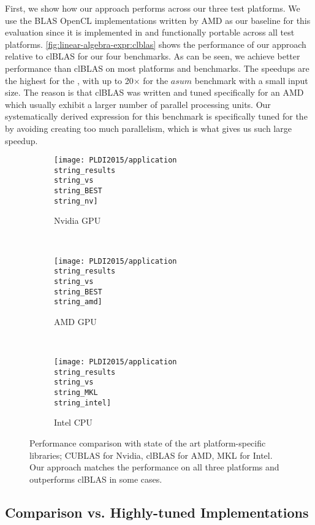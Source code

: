 First, we show how our approach performs across our three test platforms.
We use the BLAS OpenCL implementations written by AMD as our baseline for this evaluation since it is implemented in \OpenCL and functionally portable across all test platforms.
\autoref{fig:linear-algebra-expr:clblas} shows the performance of our approach relative to clBLAS for our four benchmarks.
As can be seen, we achieve better performance than clBLAS on most platforms and benchmarks.
The speedups are the highest for the \CPU, with up to 20$\times$ for the $asum$ benchmark with a small input size.
The reason is that clBLAS was written and tuned specifically for an AMD \GPU which usually exhibit a larger number of parallel processing units.
Our systematically derived expression for this benchmark is specifically tuned for the \CPU by avoiding creating too much parallelism, which is what gives us such large speedup.

\begin{figure*}[p]
  \centering
  \begin{subfigure}[b]{0.65\linewidth}
    \texttt{[image: PLDI2015/application\\string\_results\\string\_vs\\string\_BEST\\string\_nv]}
    \caption{Nvidia GPU}
    \label{fig:linear-algebra-expr:results:nv}
  \end{subfigure}
  \\
  \begin{subfigure}[b]{0.65\linewidth}
    \texttt{[image: PLDI2015/application\\string\_results\\string\_vs\\string\_BEST\\string\_amd]}
    \caption{AMD GPU}
    \label{fig:linear-algebra-expr:results:amd}
  \end{subfigure}
  \\
  \begin{subfigure}[b]{0.65\linewidth}
    \texttt{[image: PLDI2015/application\\string\_results\\string\_vs\\string\_MKL\\string\_intel]}
    \caption{Intel CPU}
    \label{fig:linear-algebra-expr:results:intel}
  \end{subfigure}
  \caption{Performance comparison with state of the art platform-specific libraries; CUBLAS for Nvidia, clBLAS for AMD, MKL for Intel.
           Our approach matches the performance on all three platforms and outperforms clBLAS in some cases.
         }
   \label{fig:linear-algebra-expr:results}
\end{figure*}




\subsection{Comparison vs. Highly-tuned Implementations}


